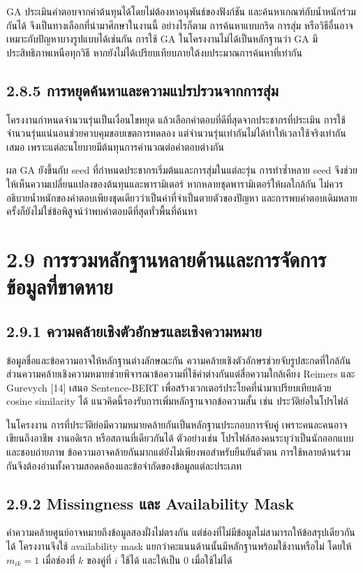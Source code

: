 \documentclass[12pt,a4paper]{report}
\begin{document}
GA ประเมินคำตอบจากค่าต้นทุนได้โดยไม่ต้องหาอนุพันธ์ของฟังก์ชัน และค้นหาเกณฑ์กับน้ำหนักร่วมกันได้ จึงเป็นทางเลือกที่นำมาศึกษาในงานนี้ อย่างไรก็ตาม การค้นหาแบบกริด การสุ่ม หรือวิธีอื่นอาจเหมาะกับปัญหาบางรูปแบบได้เช่นกัน การใช้ GA ในโครงงานไม่ได้เป็นหลักฐานว่า GA มีประสิทธิภาพเหนือทุกวิธี หากยังไม่ได้เปรียบเทียบภายใต้งบประมาณการค้นหาที่เท่ากัน

\subsection*{2.8.5 การหยุดค้นหาและความแปรปรวนจากการสุ่ม}
โครงงานกำหนดจำนวนรุ่นเป็นเงื่อนไขหยุด แล้วเลือกคำตอบที่ดีที่สุดจากประชากรที่ประเมิน การใช้จำนวนรุ่นแน่นอนช่วยควบคุมขอบเขตการทดลอง แต่จำนวนรุ่นเท่ากันไม่ได้ทำให้เวลาใช้จริงเท่ากันเสมอ เพราะแต่ละนโยบายมีต้นทุนการคำนวณต่อคำตอบต่างกัน

ผล GA ยังขึ้นกับ seed ที่กำหนดประชากรเริ่มต้นและการสุ่มในแต่ละรุ่น การทำซ้ำหลาย seed จึงช่วยให้เห็นความเปลี่ยนแปลงของต้นทุนและพารามิเตอร์ หากหลายชุดพารามิเตอร์ให้ผลใกล้กัน ไม่ควรอธิบายน้ำหนักของคำตอบเพียงชุดเดียวว่าเป็นค่าที่จำเป็นตายตัวของปัญหา และการพบคำตอบเดิมหลายครั้งก็ยังไม่ใช่ข้อพิสูจน์ว่าพบคำตอบดีที่สุดทั่วพื้นที่ค้นหา

\section*{2.9 การรวมหลักฐานหลายด้านและการจัดการข้อมูลที่ขาดหาย}
\subsection*{2.9.1 ความคล้ายเชิงตัวอักษรและเชิงความหมาย}
ข้อมูลชื่อและข้อความอาจให้หลักฐานต่างลักษณะกัน ความคล้ายเชิงตัวอักษรช่วยจับรูปสะกดที่ใกล้กัน ส่วนความคล้ายเชิงความหมายช่วยพิจารณาข้อความที่ใช้คำต่างกันแต่สื่อความใกล้เคียง Reimers และ Gurevych [14] เสนอ Sentence-BERT เพื่อสร้างเวกเตอร์ประโยคที่นำมาเปรียบเทียบด้วย cosine similarity ได้ แนวคิดนี้รองรับการเพิ่มหลักฐานจากข้อความสั้น เช่น ประวัติย่อในโปรไฟล์

ในโครงงาน การที่ประวัติย่อมีความหมายคล้ายกันเป็นหลักฐานประกอบการจับคู่ เพราะคนละคนอาจเขียนถึงอาชีพ งานอดิเรก หรือสถานที่เดียวกันได้ ตัวอย่างเช่น โปรไฟล์สองคนระบุว่าเป็นนักออกแบบและชอบถ่ายภาพ ข้อความอาจคล้ายกันมากแต่ยังไม่เพียงพอสำหรับยืนยันตัวตน การใช้หลายด้านร่วมกันจึงต้องอ่านทั้งความสอดคล้องและข้อจำกัดของข้อมูลแต่ละประเภท

\subsection*{2.9.2 Missingness และ Availability Mask}
ค่าความคล้ายศูนย์อาจหมายถึงข้อมูลสองฝั่งไม่ตรงกัน แต่ช่องที่ไม่มีข้อมูลไม่สามารถให้ข้อสรุปเดียวกันได้ โครงงานจึงใช้ availability mask แยกว่าคะแนนด้านนั้นมีหลักฐานพร้อมใช้งานหรือไม่ โดยให้ $m_{ik}=1$ เมื่อช่องที่ $k$ ของคู่ที่ $i$ ใช้ได้ และให้เป็น 0 เมื่อใช้ไม่ได้
\end{document}
